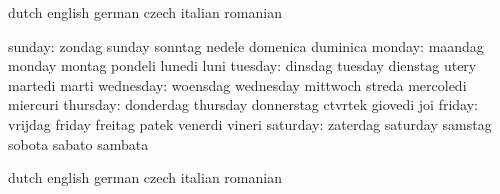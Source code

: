 \stopvariables




\startvariables            dutch                     english
                           german                    czech
                           italian                   romanian

                   sunday: zondag                    sunday
                           sonntag                   nedele
                           domenica                  duminica
                   monday: maandag                   monday
                           montag                    pondeli
                           lunedi                    luni
                  tuesday: dinsdag                   tuesday
                           dienstag                  utery
                           martedi                   marti
                wednesday: woensdag                  wednesday
                           mittwoch                  streda
                           mercoledi                 miercuri
                 thursday: donderdag                 thursday
                           donnerstag                ctvrtek
                           giovedi                   joi
                   friday: vrijdag                   friday
                           freitag                   patek
                           venerdi                   vineri
                 saturday: zaterdag                  saturday
                           samstag                   sobota
                           sabato                    sambata
\stopvariables

\startvariables            dutch                     english
                           german                    czech
                           italian                   romanian

